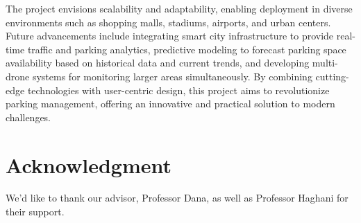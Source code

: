 \documentclass[conference]{IEEEtran}
\begin{document}
The project envisions scalability and adaptability, 
enabling deployment in diverse environments such as shopping malls, 
stadiums, 
airports, 
and urban centers. 
Future advancements include integrating smart city infrastructure to provide real-time traffic and parking analytics, 
predictive modeling to forecast parking space availability based on historical data and current trends, 
and developing multi-drone systems for monitoring larger areas simultaneously. 
By combining cutting-edge technologies with user-centric design, 
this project aims to revolutionize parking management, 
offering an innovative and practical solution to modern challenges.

\section*{Acknowledgment}

We'd like to thank our advisor, Professor Dana, 
as well as Professor Haghani for their support.
\end{document}
